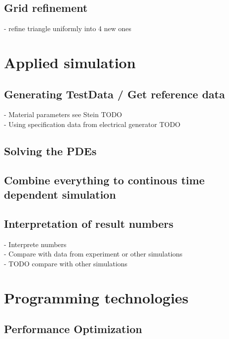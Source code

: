 \documentclass[parskip=half, titlepage=yes, 12pt, BCOR=12mm, DIV=calc]{scrartcl}
\begin{document}
\subsection{Grid refinement}
- refine triangle uniformly into 4 new ones \\




\section{Applied simulation}
\subsection{Generating TestData / Get reference data}
- Material parameters see Stein TODO \\
- Using specification data from electrical generator TODO \\

\subsection{Solving the PDEs}

\subsection{Combine everything to continous time dependent simulation}

\subsection{Interpretation of result numbers}
- Interprete numbers \\
- Compare with data from experiment or other simulations \\
- TODO compare with other simulations \\

\section{Programming technologies}

\subsection{Performance Optimization}
\end{document}
